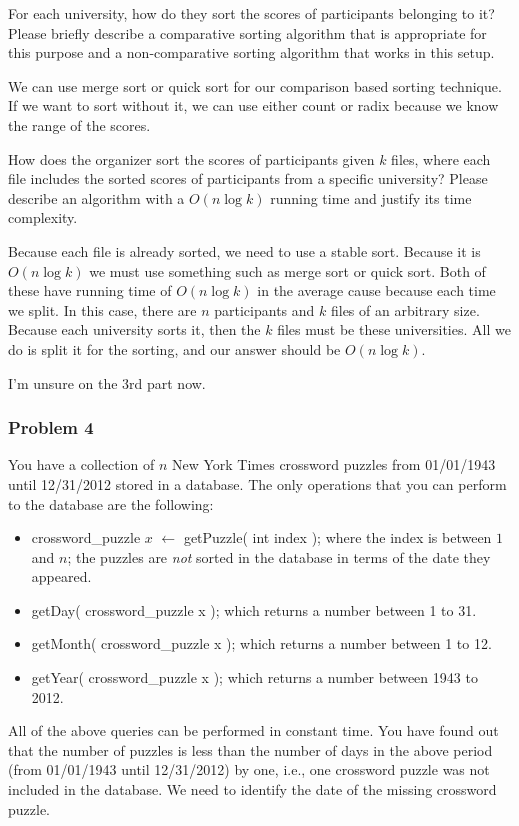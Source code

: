 \documentclass[11pt]{article}
\begin{document}
For each university, how do they sort the scores of participants
  belonging to it? Please briefly describe a comparative sorting
  algorithm that is appropriate for this purpose and a non-comparative
  sorting algorithm that works in this setup.
  
  We can use merge sort or quick sort for our comparison based sorting technique. If we want to sort without it, we can use either count or radix because we know the range of the scores.
  
  How does the organizer sort the scores of participants given $k$
  files, where each file includes the sorted scores of participants
  from a specific university?  Please describe an algorithm with a
  $O(n\log k)$ running time and justify its time complexity.
  
  Because each file is already sorted, we need to use a stable sort. Because it is $O(n\log k)$ we must use something such as merge sort or quick sort. Both of these have running time of $O(n \log k)$ in the average cause because each time we split. In this case, there are $n$ participants and $k$ files of an arbitrary size. Because each university sorts it, then the $k$ files must be these universities. All we do is split it for the sorting, and our answer should be $O(n \log k)$.
  
  I'm unsure on the 3rd part now.


\subsubsection*{Problem 4} 

You have a collection of $n$ New York Times
crossword puzzles from 01/01/1943 until 12/31/2012 stored in a
database. The only operations that you can perform to the database are
the following:
\begin{itemize}
\item crossword\_puzzle $x$ $\leftarrow$ getPuzzle( int index ); where the
  index is between $1$ and $n$; the puzzles are \emph{not} sorted in the
  database in terms of the date they appeared.
\item getDay( crossword\_puzzle x ); which returns a number between 1
  to 31.
\item getMonth( crossword\_puzzle x ); which returns a number between
  1 to 12.
\item getYear( crossword\_puzzle x ); which returns a number between
  1943 to 2012.
\end{itemize}
All of the above queries can be performed in constant time. You have
found out that the number of puzzles is less than the number of days
in the above period (from 01/01/1943 until 12/31/2012) by one, i.e.,
one crossword puzzle was not included in the database. We need to
identify the date of the missing crossword puzzle.
\end{document}
